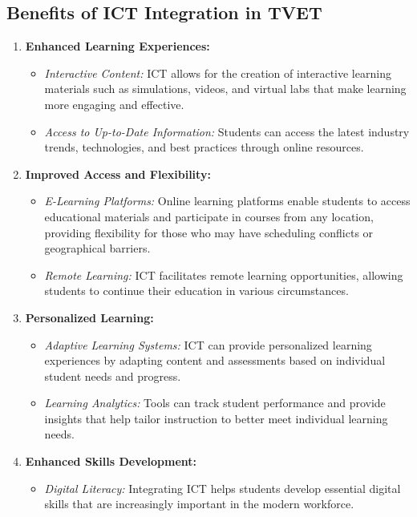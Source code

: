 \documentclass[10pt]{article}
\begin{document}
\subsection*{Benefits of ICT Integration in TVET}

\begin{enumerate}
    \item \textbf{Enhanced Learning Experiences:}
    \begin{itemize}
        \item \textit{Interactive Content:} ICT allows for the creation of interactive learning materials such as simulations, videos, and virtual labs that make learning more engaging and effective.
        \item \textit{Access to Up-to-Date Information:} Students can access the latest industry trends, technologies, and best practices through online resources.
    \end{itemize}
    \item \textbf{Improved Access and Flexibility:}
    \begin{itemize}
        \item \textit{E-Learning Platforms:} Online learning platforms enable students to access educational materials and participate in courses from any location, providing flexibility for those who may have scheduling conflicts or geographical barriers.
        \item \textit{Remote Learning:} ICT facilitates remote learning opportunities, allowing students to continue their education in various circumstances.
    \end{itemize}
    \item \textbf{Personalized Learning:}
    \begin{itemize}
        \item \textit{Adaptive Learning Systems:} ICT can provide personalized learning experiences by adapting content and assessments based on individual student needs and progress.
        \item \textit{Learning Analytics:} Tools can track student performance and provide insights that help tailor instruction to better meet individual learning needs.
    \end{itemize}
    \item \textbf{Enhanced Skills Development:}
    \begin{itemize}
        \item \textit{Digital Literacy:} Integrating ICT helps students develop essential digital skills that are increasingly important in the modern workforce.

\end{itemize}
\end{enumerate}
\end{document}

